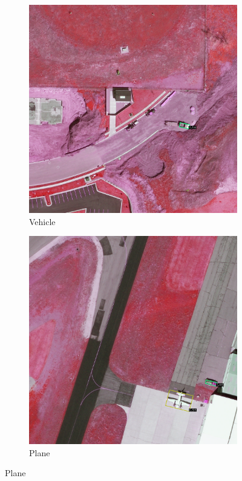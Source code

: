 \begin{figure}[h!]
    \begin{subfigure}[t]{0.38\textwidth}
        \centering
        \includegraphics[width=\linewidth]{images/015Results/02perm_exp/comp_images/rirb/427.png}
        \caption{Vehicle}
    \end{subfigure}
    \begin{subfigure}[t]{0.38\textwidth}
        \centering
        \includegraphics[width=\linewidth]{images/015Results/02perm_exp/comp_images/rirb/487.png}
        \caption{Plane}
    \end{subfigure}
    

\end{figure}
